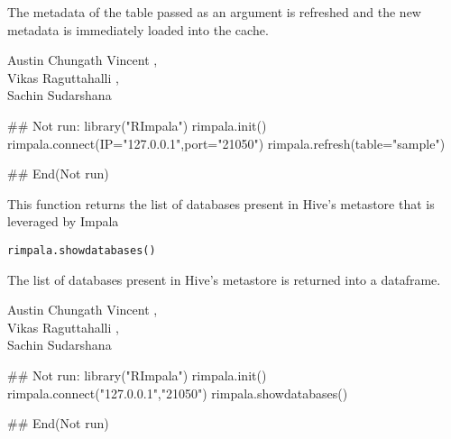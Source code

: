 \documentclass[letterpaper]{book}
\begin{document}
%
\begin{Value}
The metadata of the table passed as an argument is refreshed and the new metadata is immediately loaded into the cache.
\end{Value}
%
\begin{Author}\relax
Austin Chungath Vincent ,\\{}
Vikas Raguttahalli ,\\{}
Sachin Sudarshana 
\end{Author}
%
\begin{Examples}
\begin{ExampleCode}
## Not run: 
library("RImpala")
rimpala.init()
rimpala.connect(IP="127.0.0.1",port="21050")
rimpala.refresh(table="sample")

## End(Not run)
\end{ExampleCode}
\end{Examples}
%
\begin{Description}\relax
This function returns the list of databases present in Hive's metastore that is leveraged by Impala
\end{Description}
%
\begin{Usage}
\begin{verbatim}
rimpala.showdatabases()
\end{verbatim}
\end{Usage}
%
\begin{Value}
The list of databases present in Hive's metastore is returned into a dataframe.
\end{Value}
%
\begin{Author}\relax
Austin Chungath Vincent ,\\{}
Vikas Raguttahalli ,\\{}
Sachin Sudarshana 
\end{Author}
%
\begin{Examples}
\begin{ExampleCode}
## Not run: 
library("RImpala")
rimpala.init()
rimpala.connect("127.0.0.1","21050")
rimpala.showdatabases()

## End(Not run)
\end{ExampleCode}
\end{Examples}
\end{document}
